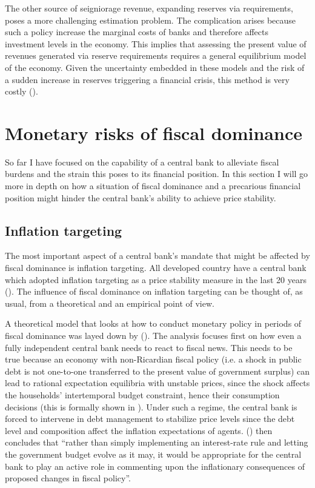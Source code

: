 \documentclass[american]{scrartcl}
\newcommand{\citein}[1]{\citeauthor{#1} (\citeyear{#1})}
\begin{document}
The other source of seigniorage revenue, expanding reserves via requirements, poses a more challenging estimation problem. The complication arises because such a policy increase the marginal costs of banks and therefore affects investment levels in the economy. This implies that assessing the present value of revenues generated via reserve requirements requires a general equilibrium model of the economy. Given the uncertainty embedded in these models and the risk of a sudden increase in reserves triggering a financial crisis, this method is very costly (\cite{Hoggarth2002}).

\section{Monetary risks of fiscal dominance}

So far I have focused on the capability of a central bank to alleviate fiscal burdens and the strain this poses to its financial position. In this section I will go more in depth on how a situation of fiscal dominance and a precarious financial position might hinder the central bank's ability to achieve price stability.

\subsection{Inflation targeting}

The most important aspect of a central bank's mandate that might be affected by fiscal dominance is inflation targeting. All developed country have a central bank which adopted inflation targeting as a price stability measure in the last 20 years (\cite{Ahmed2021}). The influence of fiscal dominance on inflation targeting can be thought of, as usual, from a theoretical and an empirical point of view.

A theoretical model that looks at how to conduct monetary policy in periods of fiscal dominance was layed down by \citein{Woodford1998}. The analysis focuses first on how even a fully independent central bank needs to react to fiscal news. This needs to be true because an economy with non-Ricardian fiscal policy (i.e. a shock in public debt is not one-to-one transferred to the present value of government surplus) can lead to rational expectation equilibria with unstable prices, since the shock affects the households' intertemporal budget constraint, hence their consumption decisions (this is formally shown in \cite[p. 123]{Woodford1998}). Under such a regime, the central bank is forced to intervene in debt management to stabilize price levels since the debt level and composition affect the inflation expectations of agents. \citein{Woodford1998} then concludes that “rather than simply implementing an interest-rate rule and letting the government budget evolve as it may, it would be appropriate for the central bank to play an active role in commenting upon the inflationary consequences of proposed changes in fiscal policy”.
\end{document}

